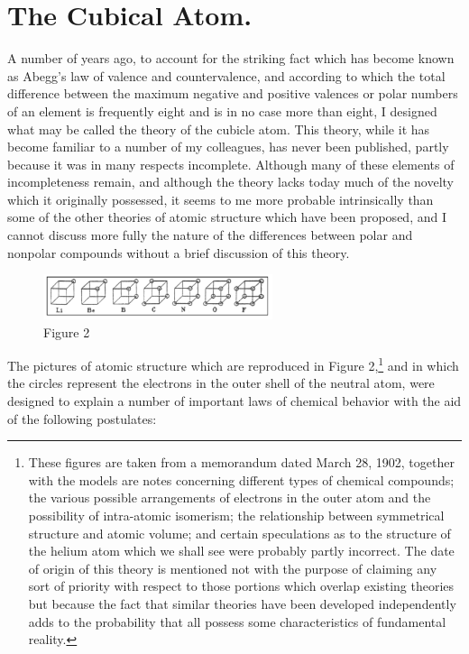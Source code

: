 \documentclass[11pt]{memoir}
\begin{document}
\section*{The Cubical Atom.}

A number of years ago, to account for the striking fact which has become known as Abegg's law of valence and countervalence, and according to which the total difference between the maximum negative and positive valences or polar numbers of an element is frequently eight and is in no case more than eight, I designed what may be called the theory of the cubicle atom.  This theory, while it has become familiar to a number of my colleagues, has never been published, partly because it was in many respects incomplete.  Although many of these elements of incompleteness remain, and although the theory lacks today much of the novelty which it originally possessed, it seems to me more probable intrinsically than some of the other theories of atomic structure which have been proposed, and I cannot discuss more fully the nature of the differences between polar and nonpolar compounds without a brief discussion of this theory.

\begin{figure}
	\begin{center}
		\includegraphics[width=0.6\textwidth]{images/lewis_figure2.png}
	\end{center}
	\caption*{Figure 2}


\end{figure}


The pictures of atomic structure which are reproduced in Figure 2,\footnote{These figures are taken from a memorandum dated March 28, 1902, together with the models are notes concerning different types of chemical compounds; the various possible arrangements of electrons in the outer atom and the possibility of intra-atomic isomerism; the relationship between symmetrical structure and atomic volume; and certain speculations as to the structure of the helium atom which we shall see were probably partly incorrect.  The date of origin of this theory is mentioned not with the purpose of claiming any sort of priority with respect to those portions which overlap existing theories but because the fact that similar theories have been developed independently adds to the probability that all possess some characteristics of fundamental reality.} and in which the circles represent the electrons in the outer shell of the neutral atom, were designed to explain a number of important laws of chemical behavior with the aid of the following postulates:
\end{document}
